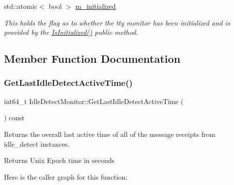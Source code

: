 \begin{DoxyCompactItemize}
\mbox{\label{classEventDetect_1_1IdleDetectMonitor_a9247d67e3ace050925e119bfbb45dcc5}} 
std\+::atomic$<$ bool $>$ \mbox{\hyperlink{classEventDetect_1_1IdleDetectMonitor_a9247d67e3ace050925e119bfbb45dcc5}{m\+\_\+initialized}}
\begin{DoxyCompactList}\small\item\em This holds the flag as to whether the tty monitor has been initialized and is provided by the \mbox{\hyperlink{classEventDetect_1_1IdleDetectMonitor_af945f0f33b8c0fe2c8ee33bd9ac83f12}{Is\+Initialized()}} public method. \end{DoxyCompactList}\end{DoxyCompactItemize}


\subsection{Member Function Documentation}
\mbox{\label{classEventDetect_1_1IdleDetectMonitor_acc4bec04aa1e47e5e7e7fae87cdf2b76}} 
\subsubsection{\texorpdfstring{Get\+Last\+Idle\+Detect\+Active\+Time()}{GetLastIdleDetectActiveTime()}}
{\footnotesize\ttfamily int64\+\_\+t Idle\+Detect\+Monitor\+::\+Get\+Last\+Idle\+Detect\+Active\+Time (\begin{DoxyParamCaption}{ }\end{DoxyParamCaption}) const}



Returns the overall last active time of all of the message receipts from idle\+\_\+detect instances. 

\begin{DoxyReturn}{Returns}
Unix Epoch time in seconds 
\end{DoxyReturn}
Here is the caller graph for this function\+:
\mbox{\label{classEventDetect_1_1IdleDetectMonitor_a2f58fdfcded4906499db6f56dd4f036b}} 

